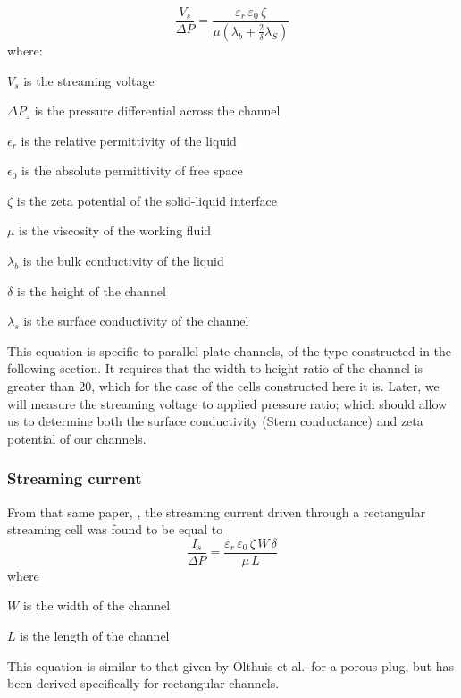 \begin{equation}
\frac{V_{s}}{\Delta P} = \frac{\varepsilon_{r}\,\varepsilon_{0}\,\zeta}{\mu(\lambda_{b}+\frac{2}{\delta}\lambda_{S})}
\label{eq:streamingVoltage_with_pressure}
\end{equation}
\noindent where:
\begin{description}
    \item $V_{s}$ is the streaming voltage
    \item $\Delta P_{z}$ is the pressure differential across the channel
    \item $\epsilon_{r}$ is the relative permittivity of the liquid
    \item $\epsilon_{0}$ is the absolute permittivity of free space
    \item $\zeta$ is the zeta potential of the solid-liquid interface
    \item $\mu$ is the viscosity of the working fluid
    \item $\lambda_{b}$ is the bulk conductivity of the liquid
    \item $\delta$ is the height of the channel
    \item $\lambda_{s}$ is the surface conductivity of the channel
\end{description}
This equation is specific to parallel plate channels, of the type constructed in the following section.
It requires that the width to height ratio of the channel is greater than 20, which for the case of the cells constructed here it is.
Later, we will measure the streaming voltage to applied pressure ratio; which should allow us to determine both the surface conductivity (Stern conductance) and zeta potential of our channels.

\subsubsection*{Streaming current}
From that same paper, \cite{Gu2000}, the streaming current driven through a rectangular streaming cell was found to be equal to
\begin{equation}
    \frac{I_{s}}{\Delta P} = \frac{\varepsilon_{r}\,\varepsilon_{0}\,\zeta\,W\,\delta}{\mu\,L}
    \label{eq:StreamingCell_StreamingCurrentFunc}
\end{equation}
where
\begin{description}
    \item $W$ is the width of the channel
    \item $L$ is the length of the channel
\end{description}
This equation is similar to that given by Olthuis et al.\ for a porous plug, but has been derived specifically for rectangular channels\cite{Olthuis2005}.

